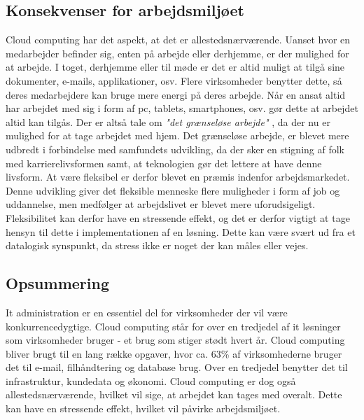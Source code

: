 \subsection{Konsekvenser for arbejdsmiljøet}
Cloud computing har det aspekt, at det er allestedsnærværende. Uanset hvor en medarbejder befinder sig, enten på arbejde eller derhjemme, er der mulighed for at arbejde. I toget, derhjemme eller til møde er det er altid muligt at tilgå sine dokumenter, e-mails, applikationer, osv. Flere virksomheder benytter dette, så deres medarbejdere kan bruge mere energi på deres arbejde. Når en ansat altid har arbejdet med sig i form af pc, tablets, smartphones, osv. gør dette at arbejdet altid kan tilgås. Der er altså tale om \textit{"det grænseløse arbejde"} \citep{SystimeStress}, da der nu er mulighed for at tage arbejdet med hjem. Det grænseløse arbejde, er blevet mere udbredt i forbindelse med samfundets udvikling, da der sker en stigning af folk med karrierelivsformen samt, at teknologien gør det lettere at have denne livsform. At være fleksibel er derfor blevet en præmis indenfor arbejdsmarkedet. Denne udvikling giver det fleksible menneske flere muligheder i form af job og uddannelse, men medfølger at arbejdslivet er blevet mere uforudsigeligt. Fleksibilitet kan derfor have en stressende effekt, og det er derfor vigtigt at tage hensyn til dette i implementationen af en løsning. Dette kan være svært ud fra et datalogisk synspunkt, da stress ikke er noget der kan måles eller vejes. \citep{SystimeStress}

\subsection{Opsummering}
It administration er en essentiel del for virksomheder der vil være konkurrencedygtige. Cloud computing står for over en tredjedel af it løsninger som virksomheder bruger - et brug som stiger stødt hvert år. Cloud computing bliver brugt til en lang række opgaver, hvor ca. 63\% af virksomhederne bruger det til e-mail, filhåndtering og database brug. Over en tredjedel benytter det til infrastruktur, kundedata og økonomi. Cloud computing er dog også allestedsnærværende, hvilket vil sige, at arbejdet kan tages med overalt. Dette kan have en stressende effekt, hvilket vil påvirke arbejdsmiljøet.




